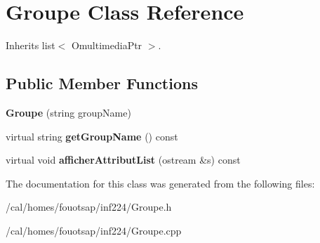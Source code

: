 \hypertarget{class_groupe}{\section{Groupe Class Reference}
\label{class_groupe}
}


Inherits list$<$ Omultimedia\+Ptr $>$.

\subsection*{Public Member Functions}
\begin{DoxyCompactItemize}
\item 
\hypertarget{class_groupe_a69bd7f1c9400e287c531c9b5f1da19cb}{{\bfseries Groupe} (string group\+Name)}\label{class_groupe_a69bd7f1c9400e287c531c9b5f1da19cb}

\item 
\hypertarget{class_groupe_a37f0f8e74f1826265933503de8a45583}{virtual string {\bfseries get\+Group\+Name} () const }\label{class_groupe_a37f0f8e74f1826265933503de8a45583}

\item 
\hypertarget{class_groupe_ab4d1294beccf02aba10b704ef9c296b9}{virtual void {\bfseries afficher\+Attribut\+List} (ostream \&s) const }\label{class_groupe_ab4d1294beccf02aba10b704ef9c296b9}

\end{DoxyCompactItemize}


The documentation for this class was generated from the following files\+:\begin{DoxyCompactItemize}
\item 
/cal/homes/fouotsap/inf224/Groupe.\+h\item 
/cal/homes/fouotsap/inf224/Groupe.\+cpp\end{DoxyCompactItemize}
